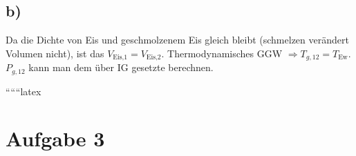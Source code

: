 

\subsection*{b)}

Da die Dichte von Eis und geschmolzenem Eis gleich bleibt (schmelzen verändert Volumen nicht), ist das $V_{\text{Eis,1}} = V_{\text{Eis,2}}$. Thermodynamisches GGW $\Rightarrow T_{g,12} = T_{\text{Ew}}$. $P_{g,12}$ kann man dem über IG gesetzte berechnen.

``````latex


\section*{Aufgabe 3}